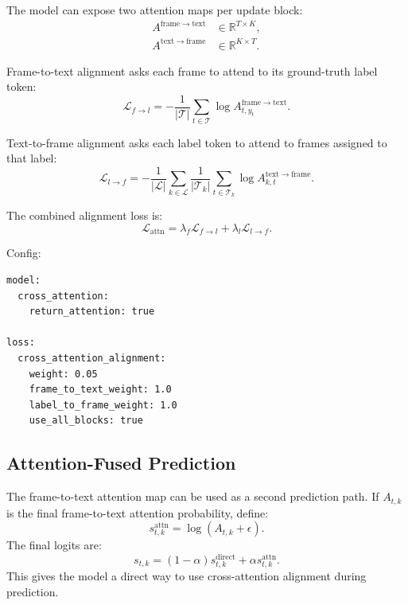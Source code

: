 \documentclass[11pt,a4paper]{article}
\newcommand{\labels}{\mathcal{L}}
\newcommand{\frames}{\mathcal{T}}
\begin{document}
The model can expose two attention maps per update block:
\begin{align}
  A^{\mathrm{frame}\rightarrow\mathrm{text}} &\in \mathbb{R}^{T \times K}, \\
  A^{\mathrm{text}\rightarrow\mathrm{frame}} &\in \mathbb{R}^{K \times T}.
\end{align}

Frame-to-text alignment asks each frame to attend to its ground-truth label token:
\begin{equation}
  \mathcal{L}_{f \rightarrow l}
  =
  -\frac{1}{|\frames|}
  \sum_{t \in \frames}
  \log A^{\mathrm{frame}\rightarrow\mathrm{text}}_{t,y_t}.
\end{equation}

Text-to-frame alignment asks each label token to attend to frames assigned to that
label:
\begin{equation}
  \mathcal{L}_{l \rightarrow f}
  =
  -\frac{1}{|\labels|}
  \sum_{k \in \labels}
  \frac{1}{|\frames_k|}
  \sum_{t \in \frames_k}
  \log A^{\mathrm{text}\rightarrow\mathrm{frame}}_{k,t}.
\end{equation}

The combined alignment loss is:
\begin{equation}
  \mathcal{L}_{\mathrm{attn}}
  =
  \lambda_f \mathcal{L}_{f \rightarrow l}
  +
  \lambda_l \mathcal{L}_{l \rightarrow f}.
\end{equation}

Config:
\begin{verbatim}
model:
  cross_attention:
    return_attention: true

loss:
  cross_attention_alignment:
    weight: 0.05
    frame_to_text_weight: 1.0
    label_to_frame_weight: 1.0
    use_all_blocks: true
\end{verbatim}

\subsection{Attention-Fused Prediction}

The frame-to-text attention map can be used as a second prediction path. If
$A_{t,k}$ is the final frame-to-text attention probability, define:
\begin{equation}
  s_{t,k}^{\mathrm{attn}} = \log(A_{t,k} + \epsilon).
\end{equation}
The final logits are:
\begin{equation}
  s_{t,k}
  =
  (1-\alpha)s_{t,k}^{\mathrm{direct}}
  +
  \alpha s_{t,k}^{\mathrm{attn}}.
\end{equation}
This gives the model a direct way to use cross-attention alignment during prediction.
\end{document}
